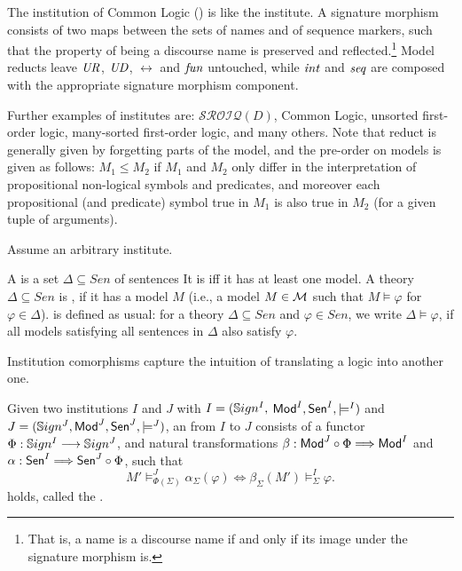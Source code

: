 \documentclass[10pt,%
\ifpretendfinal
final%
\else
draft%
\fi,
]{scrreprt}
\begin{document}
\begin{definition}\label{CommonLogic}
The institution of Common Logic (\Clogic) is like the institute. A \Clogic signature morphism 
consists of two maps between the sets of names and of sequence markers, such that the property of 
being a discourse name is preserved and reflected.\footnote{That is, a name is a discourse
name if and only if its image under the signature morphism is.}  Model reducts leave $\mathit{UR}$, $\mathit{UD}$, 
$\rel$ and $\mathit{fun}$ untouched, while $\mathit{int}$ and $\mathit{seq}$ are composed with the appropriate
signature morphism component.
\end{definition}
%



Further examples of institutes are: $\mathcal{SROIQ}(D)$, Common Logic, unsorted first-order logic, 
many-sorted first-order logic, and many others.  Note that reduct is generally given by forgetting 
parts of the model, and the pre-order on models is given as follows: $M_1\leq M_2$ if $M_1$ and 
$M_2$ only differ in the interpretation of propositional non-logical symbols and predicates, and 
moreover each propositional (and predicate) symbol true in $M_1$ is also true in $M_2$ (for a
given tuple of arguments).

Assume an arbitrary institute.

A  is a set $\Delta\subseteq Sen$ of sentences It is  iff it 
has at least one model. A theory $\Delta\subseteq Sen$ is , if it has a model
$M$ (i.e., a model $M \in {\cal M}$ such that $M\models\varphi$ for $\varphi\in\Delta$).
 is defined as usual: for  a theory $\Delta\subseteq Sen$ and 
$\varphi\in Sen$, we write $\Delta\models\varphi$, if all models satisfying all sentences in
$\Delta$ also satisfy $\varphi$.



Institution comorphisms capture the intuition of translating a
logic into another one. 

\begin{definition} Given two institutions $I$ and $J$ with $I = (\mathbb{S}ign^I,$ $ \mathsf{Mod}^I, \mathsf{Sen}^I, \models^I)$ and $J = (\mathbb{S}ign^J, \mathsf{Mod}^J,
\mathsf{Sen}^J, \models^J)$, an  from $I$ to
$J$ consists of a functor $\Phi : \mathbb{S}ign^I \longrightarrow \mathbb{S}ign^J$, and
natural transformations $\beta: \mathsf{Mod}^J \circ \Phi \Longrightarrow \mathsf{Mod}^I$
and $\alpha: \mathsf{Sen}^I \Longrightarrow \mathsf{Sen}^J \circ \Phi$, such that 
$$ M'\models^{J}_{\Phi(\Sigma)}\alpha_{\Sigma}(\varphi) \Leftrightarrow
\beta_{\Sigma}(M')\models^I_{\Sigma}\varphi.
$$
holds, called the .
\end{definition}
\end{document}
